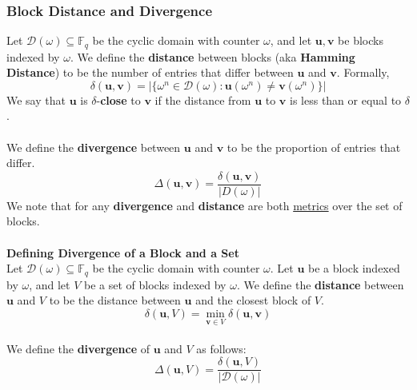 \documentclass[10pt,letterpaper,titlepage]{article}
\newcommand{\GF}[1]{\mathbb{F}_{#1}}
\newcommand{\w}[0]{\omega}
\newcommand{\D}[0]{\mathcal{D}}
\theoremstyle{definition}
\begin{document}
\begin{appendices}
\subsubsection{Block Distance and Divergence}
\label{distance}
Let $\D(\w)\subseteq\GF{q}$ be the cyclic domain with counter $\w$, and let $\mathbf{u},\mathbf{v}$ be blocks indexed by $\w$. 
We define the \textbf{distance} between blocks (aka \textbf{Hamming Distance}) to be the number of entries that differ between $\mathbf{u}$ and $\mathbf{v}$. 
Formally,
$$\delta(\mathbf{u},\mathbf{v})=|\{\w^n\in\D(\w):\mathbf{u}(\w^n)\neq \mathbf{v}(\w^n)\}|$$
We say that $\mathbf{u}$ is $\delta$-\textbf{close} to $\mathbf{v}$ if the distance from $\mathbf{u}$ to $\mathbf{v}$ is less than or equal to $\delta$.\\
\\
We define the \textbf{divergence} between $\mathbf{u}$ and $\mathbf{v}$ to be the proportion of entries that differ.
$$\Delta(\mathbf{u},\mathbf{v})=\frac{\delta(\mathbf{u},\mathbf{v})}{|D(\w)|}$$
We note that for any \textbf{divergence} and \textbf{distance} are both \href{https://en.wikipedia.org/wiki/Metric_(mathematics)#Definition} {metrics} over the set of blocks. \\
\\
\textbf{Defining Divergence of a Block and a Set}\\
Let $\D(\w)\subseteq\GF{q}$ be the cyclic domain with counter $\w$. Let $\mathbf{u}$ be a block indexed by $\w$, and let $V$ be a set of blocks indexed by $\w$. 
We define the \textbf{distance} between $\mathbf{u}$ and $V$ to be the distance between $\mathbf{u}$ and the closest block of $V$.
$$\delta(\mathbf{u},V)=\min_{\mathbf{v} \in V} \delta(\mathbf{u},\mathbf{v})$$
\\
We define the \textbf{divergence} of $\mathbf{u}$ and $V$ as follows: $$\Delta(\mathbf{u},V)=\frac{\delta(\mathbf{u},V)}{|\D(\w)|}$$
\\

\end{appendices}
\end{document}
